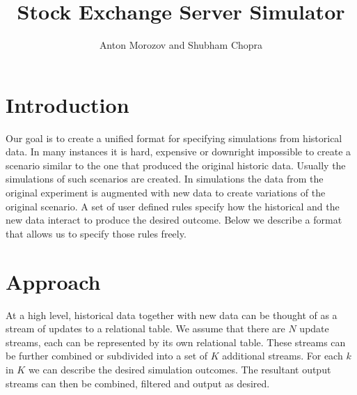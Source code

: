 \documentclass{article}
\begin{document}
    
\title{Stock Exchange Server Simulator}
\author{Anton Morozov and Shubham Chopra}
\maketitle
    
\section{Introduction}

Our goal is to create a unified format for specifying simulations from historical data. In many instances it is hard, expensive or downright impossible to create a scenario similar to the one that produced the original historic data. Usually the simulations of such scenarios are created. In simulations the data from the original experiment is augmented with new data to create variations of the original scenario. A set of user defined rules specify how the historical and the new data interact to produce the desired outcome. Below we describe a format that allows us to specify those rules freely. 


\section{Approach}

At a high level, historical data together with new data can be thought of as a stream of updates to a relational table. We assume that there are $N$ update streams, each can be represented by its own relational table. These streams can be further combined or subdivided into a set of $K$ additional streams. For each $k$ in $K$ we can describe the desired simulation outcomes. The resultant output streams can then be combined, filtered and output as desired.


\end{document}
